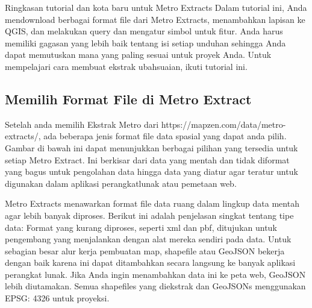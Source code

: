 Ringkasan tutorial dan kota baru untuk Metro Extracts
Dalam tutorial ini, Anda mendownload berbagai format file dari Metro Extracts, menambahkan lapisan ke QGIS, dan melakukan query dan mengatur simbol untuk fitur. Anda harus memiliki gagasan yang lebih baik tentang isi setiap unduhan sehingga Anda dapat memutuskan mana yang paling sesuai untuk proyek Anda. Untuk mempelajari cara membuat ekstrak ubahsuaian, ikuti tutorial ini.

\subsection{Memilih Format File di Metro Extract}
Setelah anda memilih Ekstrak Metro dari https://mapzen.com/data/metro-extracts/, ada beberapa jenis format file data spasial yang dapat
anda pilih. Gambar di bawah ini dapat menunjukkan berbagai pilihan yang tersedia untuk setiap Metro Extract. Ini berkisar dari data yang
mentah dan tidak diformat yang bagus untuk pengolahan data hingga data yang diatur agar teratur untuk digunakan dalam aplikasi perangkatlunak atau pemetaan web.

Metro Extracts menawarkan format file data ruang dalam lingkup data mentah agar lebih banyak diproses. 
Berikut ini adalah penjelasan singkat tentang tipe data: Format yang kurang diproses, seperti xml dan pbf, ditujukan untuk pengembang yang menjalankan dengan alat mereka sendiri pada data. 
Untuk sebagian besar alur kerja pembuatan map, shapefile atau GeoJSON bekerja dengan baik karena ini dapat ditambahkan secara langsung ke banyak aplikasi perangkat lunak. 
Jika Anda ingin menambahkan data ini ke peta web, GeoJSON lebih diutamakan. Semua shapefiles yang diekstrak dan GeoJSONs menggunakan EPSG: 4326 untuk proyeksi.


